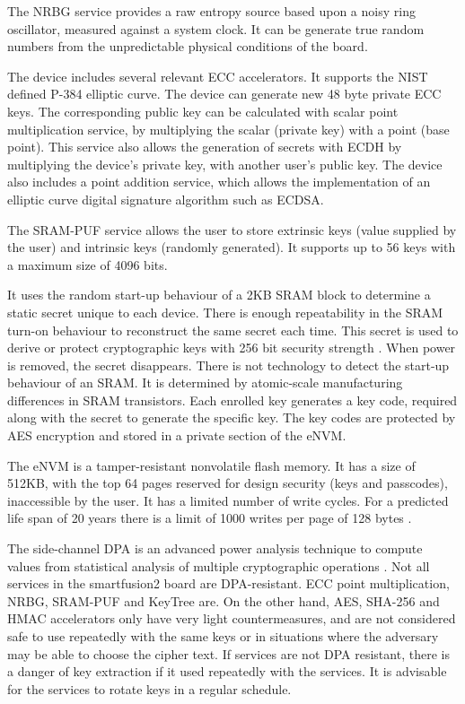 The \ac{NRBG} service provides a raw entropy source based upon a noisy ring oscillator, measured against a system clock. It can be generate true random numbers from the unpredictable physical conditions of the board.

The device includes several relevant \ac{ECC} accelerators. It supports the \ac{NIST} defined P-384 elliptic curve.
The device can generate new 48 byte private \ac{ECC} keys. The corresponding public key can be calculated with scalar point multiplication service, by multiplying the scalar (private key) with a point (base point). This service also allows the generation of secrets with \ac{ECDH} by multiplying the device's private key, with another user's public key.
The device also includes a point addition service, which allows the implementation of an elliptic curve digital signature algorithm such as ECDSA.

The SRAM-PUF service allows the user to store extrinsic keys (value supplied by the user) and intrinsic keys (randomly generated).
It supports up to 56 keys with a maximum size of 4096 bits.

It uses the random start-up behaviour of a 2KB \ac{SRAM} block to determine a static secret unique to each device. There is enough repeatability in the SRAM turn-on behaviour to reconstruct the same secret each time. This secret is used to derive or protect cryptographic keys with 256 bit security strength \cite{smartfusionSecurityPractices}.
When power is removed, the secret disappears. There is not technology to detect the start-up behaviour of an SRAM. It is determined by atomic-scale manufacturing differences in SRAM transistors.
Each enrolled key generates a key code, required along with the secret to generate the specific key.
The key codes are protected by \ac{AES} encryption and stored in a private section of the eNVM.

The eNVM is a tamper-resistant nonvolatile flash memory. It has a size of 512KB, with the top 64 pages reserved for design security (keys and passcodes), inaccessible by the user.
It has a limited number of write cycles. For a predicted life span of 20 years there is a limit of 1000 writes per page of 128 bytes \cite{smartfusionDatasheet}.

The side-channel \ac{DPA} is an advanced power analysis technique to compute values from statistical analysis of multiple cryptographic operations \cite{kocher1999differential}.
Not all services in the smartfusion2 board are \ac{DPA}-resistant. ECC point multiplication, \ac{NRBG}, SRAM-PUF and KeyTree are.
On the other hand, AES, SHA-256 and HMAC accelerators only have very light countermeasures, and are not considered safe to use repeatedly with the same keys or in situations where the adversary may be able to choose the cipher text.
If services are not DPA resistant, there is a danger of key extraction if it used repeatedly with the services.
It is advisable for the services to rotate keys in a regular schedule.

